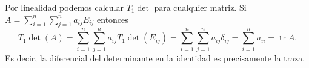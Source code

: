 \documentclass[12pt]{article}
\numberwithin{table}{section}
\numberwithin{figure}{section}
\DeclareMathOperator{\trace}{tr}
\begin{document}
Por linealidad podemos calcular \( T_1\det \) para cualquier matriz. Si \( A = \sum_{i = 1}^{n} \sum_{j = 1}^{n} a_{ij}E_{ij} \) entonces
\begin{equation*}
	T_1 \det(A) =	\sum_{i = 1}^{n} \sum_{j = 1}^{n} a_{ij} T_1 \det(E_{ij}) = \sum_{i = 1}^{n} \sum_{j = 1}^{n} a_{ij} \delta_{ij} = \sum_{i = 1}^{n} a_{ii} = \trace A. 
\end{equation*}
Es decir, la diferencial del determinante en la identidad es precisamente la traza.
\end{document}
